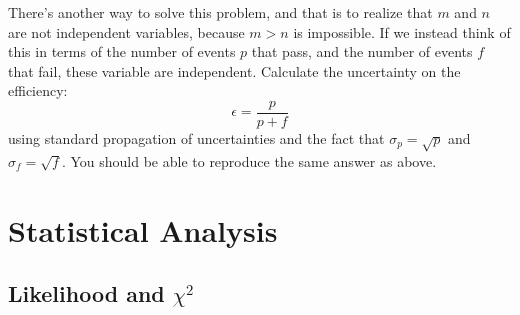 \documentclass[12pt,oneside]{book}
\begin{document}
There's another way to solve this problem, and that is to realize that $m$ and $n$ are not independent variables, because $m > n$ is impossible.  If we instead think of this in terms of the number of events $p$ that pass, and the number of events $f$ that fail, these variable are independent.  Calculate the uncertainty on the efficiency: 
\begin{displaymath}
\epsilon = \frac{p}{p+f}
\end{displaymath}
using standard propagation of uncertainties and the fact that $\sigma_p = \sqrt{p}$ and $\sigma_f = \sqrt{f}$.  You should be able to reproduce the same answer as above. \\ \vskip 0.25cm
   
%


\chapter{Statistical Analysis}

\section{Likelihood and $\chi^2$}
\end{document}
